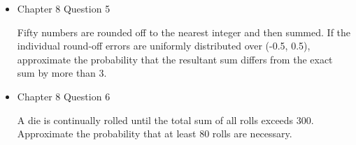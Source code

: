 \documentclass[11pt]{article}
\begin{document}
\begin{itemize}

%
%

      \item Chapter 8 Question 5
      
      Fifty numbers are rounded off to the nearest integer and then summed. If the individual round-off errors are uniformly distributed over (-0.5, 0.5), approximate the probability that the resultant sum differs from the exact sum by more than 3.
      
      \item Chapter 8 Question 6
      
      A die is continually rolled until the total sum of all rolls exceeds 300. Approximate the probability that at least 80 rolls are necessary.
\end{itemize}


\vspace{12pt}
\end{document}
